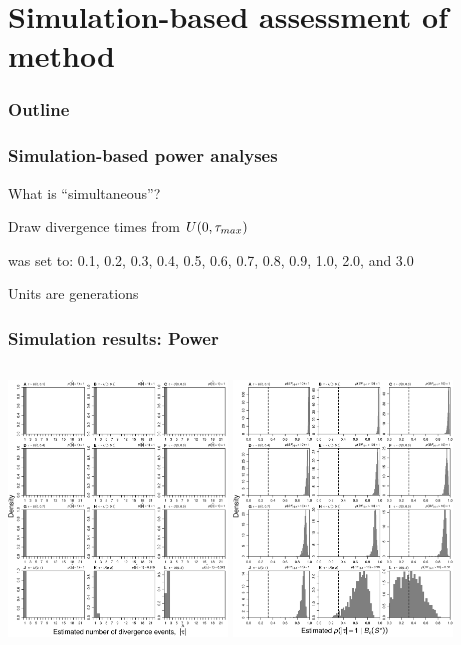 \section{Simulation-based assessment of method}

\begin{frame}
\frametitle{Outline}
\end{frame}

\begin{frame}
    \frametitle{Simulation-based power analyses}
    What is ``simultaneous''?
    \begin{myitemize}
        \item Draw divergence times from $U(0, \tau_{max})$
        \item {} was set to:
            0.1, 0.2, 0.3, 0.4, 0.5, 0.6, 0.7, 0.8, 0.9, 1.0, 2.0, and 3.0
        \item Units are \globalcoalunit generations
    \end{myitemize}
\end{frame}


\begin{frame}
    \frametitle{Simulation results: Power}
    \begin{columns}[c]
            \includegraphics[height=6.8cm]{images/SS_power_psi_modes.pdf}
            \includegraphics[height=6.8cm]{images/SS_power_psi_probs.pdf}
    \end{columns}
\end{frame}

